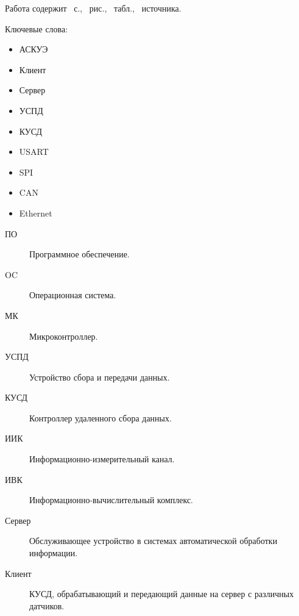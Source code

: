 \documentclass[utf8x,12pt, coursreport]{G7-32}
\begin{document}

\frontmatter %



\Referat %

Работа содержит \totalpages{}~с., \totalfigures{}~рис., \totaltables{}~табл., \totalbibs{}~источника.

Ключевые слова:
\begin{itemize}
\item АСКУЭ
\item Клиент
\item Сервер
\item УСПД
\item КУСД
\item USART
\item SPI
\item CAN
\item Ethernet
\end{itemize}

\tableofcontents

\Abbreviations

\begin{description}
\item[ПО] Программное обеспечение.
\item[OC] Операционная система.
\item[МК] Микроконтроллер.
\item[УСПД] Устройство сбора и передачи данных.
\item[КУСД] Контроллер удаленного сбора данных.
\item[ИИК] Информационно-измерительный канал.
\item[ИВК] Информационно-вычислительный комплекс.
\item[Сервер] Обслуживающее устройство в системах автоматической обработки информации.
\item[Клиент] КУСД, обрабатывающий и передающий данные на сервер с различных датчиков.
\end{description}
\end{document}
